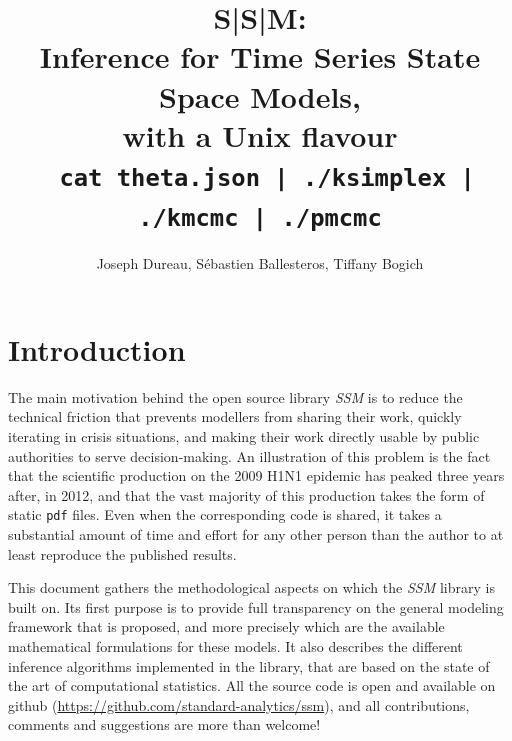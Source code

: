 \documentclass[a4paper,11pt,titlepage]{article}
\theoremstyle{plain} %
\begin{document}
\vspace{2 cm} 
\title{S|S|M:\\ Inference for Time Series State Space Models,\\ with a Unix flavour\\ \vspace{1 cm} {\large \texttt{ cat theta.json | ./ksimplex | ./kmcmc | ./pmcmc}}}


\author{Joseph Dureau, S\'ebastien Ballesteros, Tiffany Bogich}

\maketitle


\section{Introduction}

The main motivation behind the open source library \emph{SSM} is to reduce the technical friction that prevents modellers from sharing their work, quickly iterating in crisis situations, and making their work directly usable by public authorities to serve decision-making.
An illustration of this problem is the fact that the scientific production on the 2009 H1N1 epidemic has peaked three years after, in  2012, and that the vast majority of this production takes the form of static  \texttt{pdf} files. Even when the corresponding code is shared, it takes a substantial amount of time and effort for any other person than the author to at least reproduce the published results. 

This document gathers the methodological aspects on which the \emph{SSM} library is built on. Its first purpose is to provide full transparency on the general modeling framework that is proposed, and more precisely which are the available mathematical formulations for these models. It also describes the different inference algorithms implemented in the library, that are based on the state of the art of computational statistics.  All the source code is open and available on github (\href{https://github.com/standard-analytics/ssm}{https://github.com/standard-analytics/ssm}), and all contributions, comments and suggestions are more than welcome!
\end{document}

